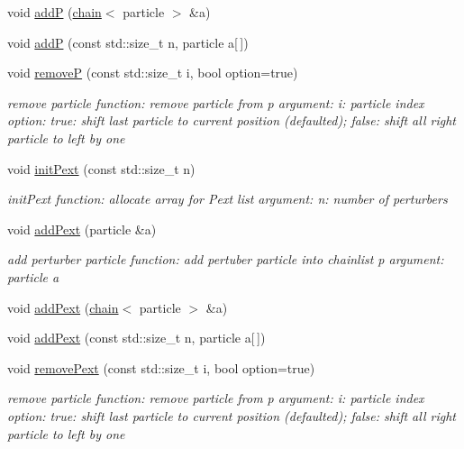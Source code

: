 \begin{DoxyCompactItemize}
void \hyperlink{classchain_a1ad83d089ce15a5bd09ec0bd47a8e0fc}{addP} (\hyperlink{classchain}{chain}$<$ particle $>$ \&a)
\item 
void \hyperlink{classchain_aa8991445a46067f7196fad6fd1d975c4}{addP} (const std\+::size\+\_\+t n, particle a\mbox{[}$\,$\mbox{]})
\item 
void \hyperlink{classchain_afcf23f66ae1f2a8a20787c9767d01a99}{removeP} (const std\+::size\+\_\+t i, bool option=true)
\begin{DoxyCompactList}\small\item\em remove particle function\+: remove particle from p argument\+: i\+: particle index option\+: true\+: shift last particle to current position (defaulted); false\+: shift all right particle to left by one \end{DoxyCompactList}\item 
void \hyperlink{classchain_acc7edf934b406995525aea0533cd87d4}{init\+Pext} (const std\+::size\+\_\+t n)
\begin{DoxyCompactList}\small\item\em init\+Pext function\+: allocate array for Pext list argument\+: n\+: number of perturbers \end{DoxyCompactList}\item 
void \hyperlink{classchain_ae41d460ef51d06c4474285f866caea02}{add\+Pext} (particle \&a)
\begin{DoxyCompactList}\small\item\em add perturber particle function\+: add pertuber particle into chainlist p argument\+: particle a \end{DoxyCompactList}\item 
void \hyperlink{classchain_a2e2533d167715198a0316ce037dbd34f}{add\+Pext} (\hyperlink{classchain}{chain}$<$ particle $>$ \&a)
\item 
void \hyperlink{classchain_ae838fccf5313905d44690ef6cf08160d}{add\+Pext} (const std\+::size\+\_\+t n, particle a\mbox{[}$\,$\mbox{]})
\item 
void \hyperlink{classchain_a3b80366fe18fc80159b4c5c5168d010c}{remove\+Pext} (const std\+::size\+\_\+t i, bool option=true)
\begin{DoxyCompactList}\small\item\em remove particle function\+: remove particle from p argument\+: i\+: particle index option\+: true\+: shift last particle to current position (defaulted); false\+: shift all right particle to left by one \end{DoxyCompactList}\item 

\end{DoxyCompactItemize}
